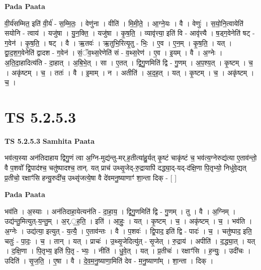 \documentclass[17pt]{extarticle}
\begin{document}
\textbf{Pada Paata} \newline

वी॒र्य॑सम्मित॒ इति॑ वी॒र्य॑ - स॒म्मि॒तः॒ । वेणु॑ना । वीति॑ । मि॒मी॒ते॒ । आ॒ग्ने॒यः । वै । वेणुः॑ । स॒यो॒नि॒त्वायेति॑ सयोनि - त्वाय॑ । यजु॑षा । यु॒न॒क्ति॒ । यजु॑षा । कृ॒ष॒ति॒ । व्यावृ॑त्त्या॒ इति॑ वि - आवृ॑त्त्यै । ष॒ड्ग॒वेनेति॑ षट् - ग॒वेन॑ । कृ॒ष॒ति॒ । षट् । वै । ऋ॒तवः॑ । ऋ॒तुभि॒रित्यृ॒तु - भिः॒ । ए॒व । ए॒न॒म् । कृ॒ष॒ति॒ । यत् । द्वा॒द॒श॒ग॒वेनेति॑ द्वादश - ग॒वेन॑ । सं॒ॅव॒थ्स॒रेणेति॑ सं - व॒थ्स॒रेण॑ । ए॒व । इ॒यम् । वै । अ॒ग्नेः । अ॒ति॒दा॒हादित्य॑ति - दा॒हात् । अ॒बि॒भे॒त् । सा । ए॒तत् । द्वि॒गु॒णमिति॑ द्वि - गु॒णम् । अ॒प॒श्य॒त् । कृ॒ष्टम् । च॒ । अकृ॑ष्टम् । च॒ । ततः॑ । वै । इ॒माम् । न । अतीति॑ । अ॒द॒ह॒त् । यत् । कृ॒ष्टम् । च॒ । अकृ॑ष्टम् । च॒ ।  \newline




\section*{ TS 5.2.5.3 }

\textbf{TS 5.2.5.3 } \newline
\textbf{Samhita Paata} \newline

भव॑त्य॒स्या अन॑तिदाहाय द्विगु॒णं त्वा अ॒ग्नि-मुद्य॑न्तु-मर्.ह॒तीत्या॑हु॒र्यत् कृ॒ष्टं चाकृ॑ष्टं च॒ भव॑त्य॒ग्नेरुद्य॑त्या ए॒ताव॑न्तो॒ वै प॒शवो᳚ द्वि॒पाद॑श्च॒ चतु॑ष्पादश्च॒ तान्. यत् प्राच॑ उथ्सृ॒जेद्-रु॒द्रायापि॑ दद्ध्या॒द्-यद्-द॑क्षि॒णा पि॒तृभ्यो॒ निधु॑वे॒द्यत् प्र॒तीचो॒ रक्षाꣳ॑सि हन्यु॒रुदी॑च॒ उथ्सृ॑जत्ये॒षा वै दे॑वमनु॒ष्याणाꣳ॑ शा॒न्ता दिक् - [  ] \newline

\textbf{Pada Paata} \newline

भव॑ति । अ॒स्याः । अन॑तिदाहा॒येत्यन॑ति - दा॒हा॒य॒ । द्वि॒गु॒णमिति॑ द्वि - गु॒णम् । तु । वै । अ॒ग्निम् । उद्य॑न्तु॒मित्युत्-य॒न्तु॒म् । अ॒र्.॒ह॒ति॒ । इति॑ । आ॒हुः॒ । यत् । कृ॒ष्टम् । च॒ । अकृ॑ष्टम् । च॒ । भव॑ति । अ॒ग्नेः । उद्य॑त्या॒ इत्युत् - य॒त्यै॒ । ए॒ताव॑न्तः । वै । प॒शवः॑ । द्वि॒पाद॒ इति॑ द्वि - पादः॑ । च॒ । चतु॑ष्पाद॒ इति॒ चतुः॑ - पा॒दः॒ । च॒ । तान् । यत् । प्राचः॑ । उ॒थ्सृ॒जेदित्यु॑त् - सृ॒जेत् । रु॒द्राय॑ । अपीति॑ । द॒द्ध्या॒त् । यत् । द॒क्षि॒णा । पि॒तृभ्य॒ इति॑ पि॒तृ - भ्यः॒ । नीति॑ । धु॒वे॒त् । यत् । प्र॒तीचः॑ । रक्षाꣳ॑सि । ह॒न्युः॒ । उदी॑चः । उदिति॑ । सृ॒ज॒ति॒ । ए॒षा । वै । दे॒व॒म॒नु॒ष्याणा॒मिति॑ देव - म॒नु॒ष्याणा᳚म् । शा॒न्ता । दिक् ।  \newline
\end{document}
